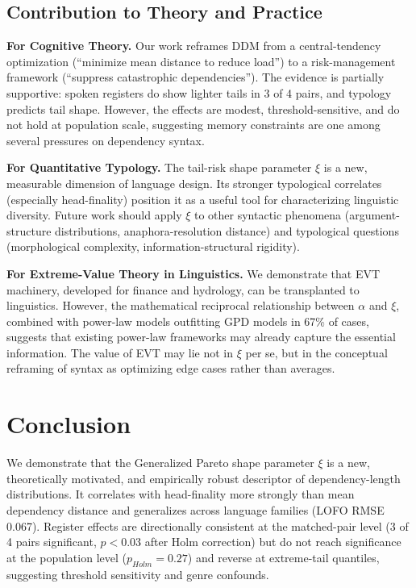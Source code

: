 \documentclass[11pt,letterpaper]{article}
\begin{document}
\subsection{Contribution to Theory and Practice}

\textbf{For Cognitive Theory.} Our work reframes DDM from a central-tendency optimization (``minimize mean distance to reduce load'') to a risk-management framework (``suppress catastrophic dependencies''). The evidence is partially supportive: spoken registers do show lighter tails in 3 of 4 pairs, and typology predicts tail shape. However, the effects are modest, threshold-sensitive, and do not hold at population scale, suggesting memory constraints are one among several pressures on dependency syntax.

\textbf{For Quantitative Typology.} The tail-risk shape parameter $\xi$ is a new, measurable dimension of language design. Its stronger typological correlates (especially head-finality) position it as a useful tool for characterizing linguistic diversity. Future work should apply $\xi$ to other syntactic phenomena (argument-structure distributions, anaphora-resolution distance) and typological questions (morphological complexity, information-structural rigidity).

\textbf{For Extreme-Value Theory in Linguistics.} We demonstrate that EVT machinery, developed for finance and hydrology, can be transplanted to linguistics. However, the mathematical reciprocal relationship between $\alpha$ and $\xi$, combined with power-law models outfitting GPD models in 67\% of cases, suggests that existing power-law frameworks may already capture the essential information. The value of EVT may lie not in $\xi$ per se, but in the conceptual reframing of syntax as optimizing edge cases rather than averages.

\section{Conclusion}

We demonstrate that the Generalized Pareto shape parameter $\xi$ is a new, theoretically motivated, and empirically robust descriptor of dependency-length distributions. It correlates with head-finality more strongly than mean dependency distance and generalizes across language families (LOFO RMSE 0.067). Register effects are directionally consistent at the matched-pair level (3 of 4 pairs significant, $p<0.03$ after Holm correction) but do not reach significance at the population level ($p_{Holm}=0.27$) and reverse at extreme-tail quantiles, suggesting threshold sensitivity and genre confounds.
\end{document}
